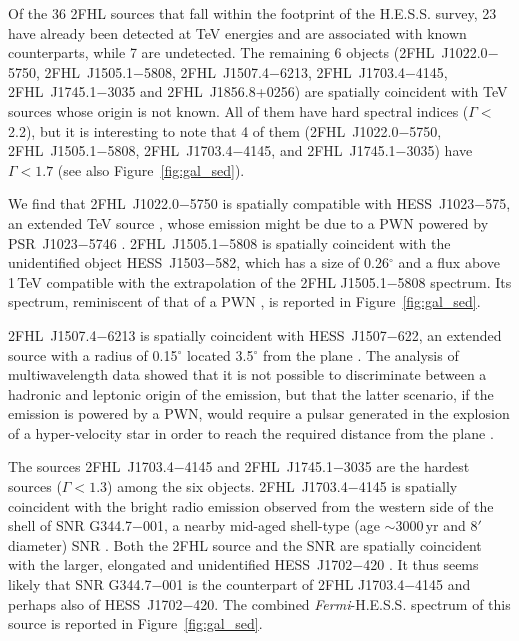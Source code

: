 Of the 36 2FHL sources that fall within the footprint of 
the H.E.S.S. survey, 23 have already been detected
at TeV energies and are associated with known counterparts,
while 7 are undetected. The remaining 6 objects
(2FHL~J1022.0$-$5750, 2FHL~J1505.1$-$5808,  2FHL~J1507.4$-$6213, 2FHL~J1703.4$-$4145, 2FHL~J1745.1$-$3035 and  2FHL~J1856.8+0256)
are spatially coincident with TeV sources whose origin is not known.
All of them have hard spectral indices ($\Gamma<$2.2), but
it is interesting to note that 4 of them 
(2FHL~J1022.0$-$5750, 2FHL~J1505.1$-$5808, 2FHL~J1703.4$-$4145, and 2FHL~J1745.1$-$3035)
have $\Gamma<1.7$ (see also Figure~\ref{fig:gal_sed}).

We find that 2FHL~J1022.0$-$5750 is spatially compatible with
{ HESS~J1023$-$575, an extended TeV source \citep{westerlund2_hess11},
	whose emission might be due to a PWN powered by PSR~J1023$-$5746 \citep{Acero13}. }
2FHL~J1505.1$-$5808 is spatially coincident with the unidentified
object HESS~J1503$-$582, which has a size of 0.26$^{\circ}$ and a flux above 1\,TeV \citep{renaud08} compatible with the extrapolation of the 2FHL J1505.1$-$5808 spectrum.
Its spectrum, reminiscent of that of a PWN 
\citep[\eg, HESS~J1825$-$137,][]{grondin2011},
 is reported in Figure~\ref{fig:gal_sed}.


2FHL~J1507.4$-$6213 is spatially coincident with HESS~J1507$-$622, an extended source with a radius of 0.15$^{\circ}$ located  3.5$^{\circ}$ from the plane \citep{acero11}. The analysis of multiwavelength data showed that it is not possible to discriminate between a hadronic and leptonic origin of the emission, but that the latter scenario, if the emission is powered by a PWN, would require a pulsar generated in the explosion of a hyper-velocity star in order to reach the required distance from the plane \citep{domainko2012}.



The sources 2FHL~J1703.4$-$4145 and 2FHL~J1745.1$-$3035 are the hardest sources ($\Gamma<1.3$) among the six objects.
2FHL~J1703.4$-$4145 is spatially coincident with the bright radio emission
observed from the western side of the shell of SNR G344.7$-$001,
a nearby mid-aged  shell-type (age $\sim3000$\,yr and 8$'$ diameter) SNR \citep{giacani2011}. Both the 2FHL source and the SNR are spatially coincident
with the larger, elongated and unidentified HESS~J1702$-$420 \citep{aharonian08}.
It thus seems likely that  SNR G344.7$-$001 is the  counterpart
of  2FHL J1703.4$-$4145 and perhaps also of HESS~J1702$-$420.
The combined {\it Fermi}-H.E.S.S. spectrum of this source is reported in Figure~\ref{fig:gal_sed}.



